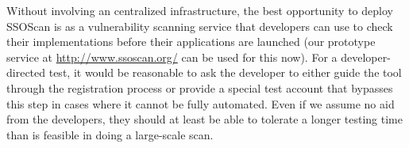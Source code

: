  Without involving an centralized infrastructure, the best opportunity to deploy SSOScan is as a vulnerability scanning service that developers can use to check their implementations before their applications are launched (our prototype service at \url{http://www.ssoscan.org/} can be used for this now).  For a developer-directed test, it would be reasonable to ask the developer to either guide the tool through the registration process or provide a special test account that bypasses this step in cases where it cannot be fully automated.  Even if we assume no aid from the developers, they should at least be able to tolerate a longer testing time than is feasible in doing a large-scale scan.